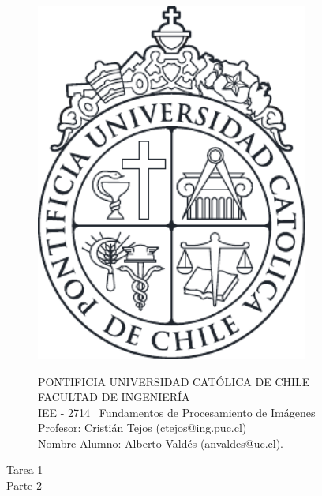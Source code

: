\documentclass[11pt]{article}
\begin{document}
\begin{figure}
\begin{minipage}{2.5cm}
\includegraphics[width=0.8\textwidth]{./figures/LogoUC-BN}
\end{minipage}
\begin{minipage}{14.5cm}
\vspace{4mm}
{\sc PONTIFICIA UNIVERSIDAD CAT\'OLICA DE CHILE}\\
{\sc FACULTAD DE INGENIER\'IA} \\
IEE - 2714 \ Fundamentos de Procesamiento de Imágenes \\
Profesor: Cristián Tejos (ctejos@ing.puc.cl) \\
Nombre Alumno: Alberto Valdés (anvaldes@uc.cl). \\

\vspace{-8mm}
\hrulefill
\end{minipage}
\end{figure}
\phantom{""}
\vspace{-10mm}
\normalsize

\begin{center}
	\huge{Tarea 1}\\
	\normalsize Parte 2 
\end{center}
\end{document}
